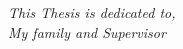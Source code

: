 \begin{onehalfspacing}  
\clearpage
\thispagestyle{empty}  
\newpage
{}
\vspace*{\fill}
\begin{center}
\textit{This Thesis is dedicated to,} \\
\textit{ My family and Supervisor} 
\end{center}  
\vspace*{\fill}



\end{onehalfspacing}